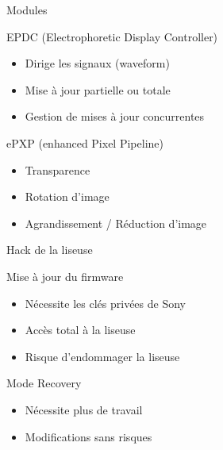 \begin{frame}{Modules}
	\vspace{-25px}
	\begin{block}{EPDC (Electrophoretic Display Controller)}
		\begin{itemize}
			\item{Dirige les signaux (waveform)}
			\item{Mise à jour partielle ou totale}
			\item{Gestion de mises à jour concurrentes}
		\end{itemize}
	\end{block}
	\begin{block}{ePXP (enhanced Pixel Pipeline)}
		\begin{itemize}
			\item Transparence
			\item Rotation d'image
			\item Agrandissement / Réduction d'image
		\end{itemize}
	\end{block}
\end{frame}

\begin{frame}{Hack de la liseuse}
	\begin{block}{Mise à jour du firmware}
		\begin{itemize}
			\item Nécessite les clés privées de Sony
			\item Accès total à la liseuse
			\item Risque d'endommager la liseuse
		\end{itemize}
	\end{block}
	\begin{block}{Mode Recovery}
		\begin{itemize}
			\item Nécessite plus de travail
			\item Modifications sans risques
		\end{itemize}
	\end{block}
\end{frame}
